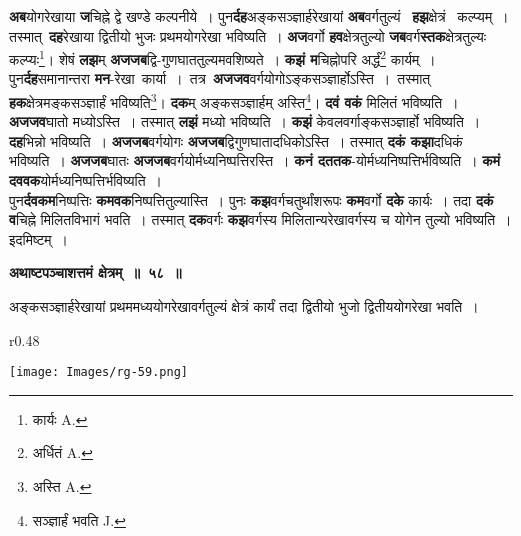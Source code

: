 \documentclass[11pt, openany]{book}
\begin{document}
\textbf{अब}योगरेखाया \textbf{ज}चिह्ने द्वे खण्डे कल्पनीये~। पुन\textbf{र्दह}अङ्कसञ्ज्ञार्हरेखायां \textbf{अब}वर्गतुल्यं ~\;\textbf{हझ}क्षेत्रं ~\;कल्प्यम्~। तस्मात् \,\textbf{दह}रेखाया \;द्वितीयो \;भुजः प्रथमयोगरेखा भविष्यति~। \textbf{अज}वर्गो \textbf{हव}क्षेत्रतुल्यो \textbf{जब}वर्ग\textbf{स्तक}क्षेत्रतुल्यः कल्प्यः\renewcommand{\thefootnote}{१}\footnote{कार्यः {\en A.}}\;। शेषं \textbf{लझ}म् \textbf{अजजब}द्वि-गुणघाततुल्यमवशिष्यते~। \textbf{कझं म}चिह्नोपरि अर्द्धं\renewcommand{\thefootnote}{२}\footnote{अर्धितं A.} कार्यम्~। पुन\textbf{र्दह}समानान्तरा \textbf{मन}-रेखा \,कार्या~। \,तत्र \,\textbf{अजजव}वर्गयोगोऽङ्कसञ्ज्ञार्होऽस्ति~। \,तस्मात् \,\textbf{हक}क्षेत्रमङ्कसञ्ज्ञार्हं भविष्यति\renewcommand{\thefootnote}{३}\footnote{अस्ति {\en A.}}\;। \textbf{दक}म् अङ्कसञ्ज्ञार्हम् अस्ति\renewcommand{\thefootnote}{४}\footnote{सञ्ज्ञार्हं भवति {\en J.}}\;। \textbf{दवं वकं} मिलितं भविष्यति~। \textbf{अजजव}घातो मध्योऽस्ति~। तस्मात् \textbf{लझं} मध्यो भविष्यति~। \textbf{कझं} केवलवर्गाङ्कसञ्ज्ञार्हो भविष्यति~। \textbf{दह}भिन्नो भविष्यति~। \textbf{अजजब}वर्गयोगः \textbf{अजजब}द्विगुणघातादधिकोऽस्ति~। तस्मात् \textbf{दकं कझा}दधिकं भविष्यति~। \textbf{अजजब}घातः \textbf{अजजब}वर्गयोर्मध्यनिष्पत्तिरस्ति~। \textbf{कनं दततक}-योर्मध्यनिष्पत्तिर्भविष्यति~। \textbf{कमं दववक}योर्मध्यनिष्पत्तिर्भविष्यति~। \\

पुन\textbf{र्दवकम}निष्पत्तिः \textbf{कमवक}निष्पत्तितुल्यास्ति~। पुनः \textbf{कझ}वर्गचतुर्थांशरूपः \textbf{कम}वर्गो \textbf{दके} कार्यः~। तदा \textbf{दकं व}चिह्ने मिलितविभागं भवति~। तस्मात् \textbf{दक}वर्गः \textbf{कझ}वर्गस्य मिलितान्यरेखावर्गस्य च योगेन तुल्यो भविष्यति~। इदमिष्टम्~।
\vspace{2mm}

\begin{center}
\textbf{\large  अथाष्टपञ्चाशत्तमं क्षेत्रम्~॥~५८~॥} 
\end{center}

 {\ab अङ्कसञ्ज्ञार्हरेखायां प्रथममध्ययोगरेखावर्गतुल्यं क्षेत्रं कार्यं तदा द्वितीयो भुजो द्वितीययोगरेखा भवति~।} 

\newpage

\begin{wrapfigure}{r}{0.48\textwidth}
\vspace{-5mm}
\begin{flushright}
\texttt{[image: Images/rg-59.png]}
\end{flushright}
\vspace{-8mm}
\end{wrapfigure}
\end{document}
